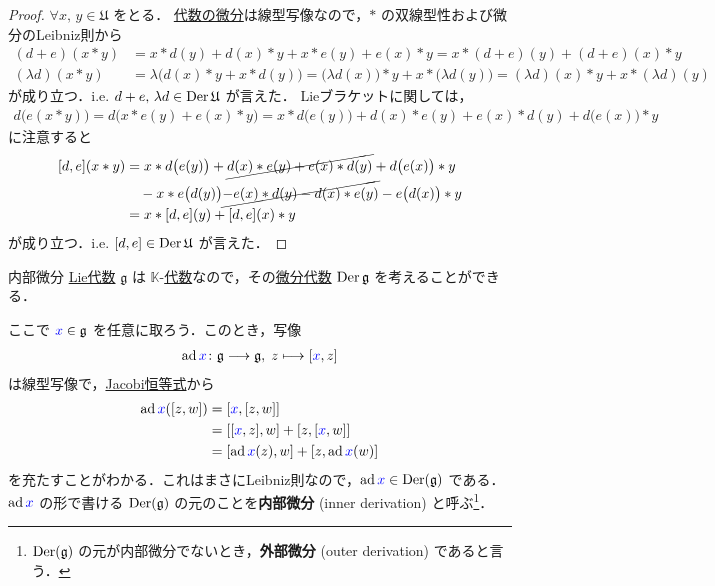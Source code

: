 \documentclass[rep_main]{subfiles}
\begin{document}
\begin{proof}
    $\forall x,\, y \in \mathfrak{U}$ をとる．
    \hyperref[def:derivation-Alg]{代数の微分}は線型写像なので，$*$ の双線型性および微分のLeibniz則から
    \begin{align}
        (d + e)(x * y) &= x * d(y) + d(x) * y + x * e(y) + e(x) * y = x * (d + e)(y) + (d + e)(x) * y \\
        (\lambda d)(x * y) &= \lambda \bigl( d(x) * y + x * d(y) \bigr) = \bigl(\lambda d(x) \bigr) * y + x * \bigl(\lambda d(y)\bigr) = (\lambda d)(x) * y + x * (\lambda d)(y)
    \end{align}
    が成り立つ．i.e. $d + e,\, \lambda d \in \operatorname{Der} \mathfrak{U}$ が言えた．
    Lieブラケットに関しては，
    \begin{align}
        d \bigl(e (x * y)\bigr) = d \bigl( x * e(y) + e(x) * y \bigr) = x * d\bigl(e(y)\bigr) + d(x) * e(y) + e(x) * d(y) + d\bigl(e(x)\bigr) * y
    \end{align}
    に注意すると
    \begin{align}
        \comm{d}{e}(x*y) 
        &= x * d\bigl(e(y)\bigr) + \cancel{d(x) * e(y) + e(x) * d(y)} + d\bigl(e(x)\bigr) * y \\
        &\quad - x * e\bigl(d(y)\bigr) \cancel{- e(x) * d(y) - d(x) * e(y)} - e\bigl(d(x)\bigr) * y \\
        &=x * \comm{d}{e}(y) + \comm{d}{e}(x) * y
    \end{align}
    が成り立つ．i.e. $\comm{d}{e} \in \Der \mathfrak{U}$ が言えた．
\end{proof}

\begin{myexample}[label=def:Der-inner]{内部微分}
    \hyperref[ax:LieAlg]{Lie代数} $\mathfrak{g}$ は $\mathbb{K}$-\hyperref[ax:Alg]{代数}なので，その\hyperref[prop:Der-LieAlg]{微分代数} $\operatorname{Der} \mathfrak{g}$ を考えることができる．
    
    ここで $\textcolor{blue}{x} \in \mathfrak{g}$ を任意に取ろう．このとき，写像
    \begin{align}
        \ad \textcolor{blue}{x} \colon \mathfrak{g} \lto \mathfrak{g},\; z \lmto \comm{\textcolor{blue}{x}}{z}
    \end{align}
    は線型写像で，\hyperref[ax:LieAlg]{Jacobi恒等式}から
    \begin{align}
        \ad \textcolor{blue}{x} (\comm{z}{w}) 
        &= \comm{\textcolor{blue}{x}}{\comm{z}{w}} \\
        &= \comm{\comm{\textcolor{blue}{x}}{z}}{w} + \comm{z}{\comm{\textcolor{blue}{x}}{w}} \\
        &= \comm{\ad \textcolor{blue}{x} (z)}{w} + \comm{z}{\ad \textcolor{blue}{x} (w)}
    \end{align}
    を充たすことがわかる．これはまさにLeibniz則なので，$\operatorname{ad} \textcolor{blue}{x} \in \operatorname{Der} (\mathfrak{g})$ である．
    $\operatorname{ad} \textcolor{blue}{x}$ の形で書ける $\operatorname{Der} (\mathfrak{g})$ の元のことを\textbf{内部微分} (inner derivation) と呼ぶ\footnote{$\operatorname{Der} (\mathfrak{g})$ の元が内部微分でないとき，\textbf{外部微分} (outer derivation) であると言う．}．
\end{myexample}
\end{document}
